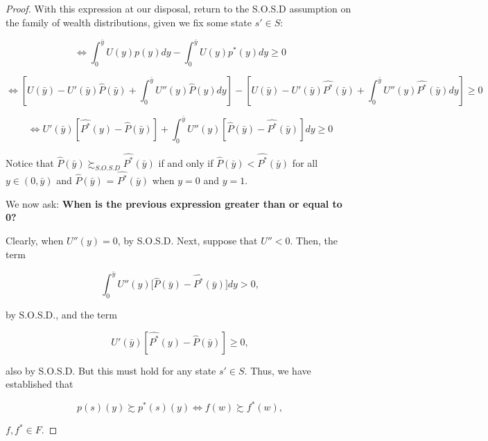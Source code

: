 \documentclass[\econtexRoot/IneqMeas]{subfiles}
\begin{document}
\begin{proof}
	\par With this expression at our disposal, return to the S.O.S.D assumption on the family of wealth distributions, given we fix some state $s' \in S$:
	
$$ \iff \int_{0}^{\bar{y}} U(y)p(y) dy - \int_{0}^{\bar{y}} U(y)p^*(y) dy  \geq 0 $$	

$$ \iff [ U(\bar{y}) - U'(\bar{y}) \hat{P}(\bar{y}) + \int_{0}^{\bar{y}} U''(y) \hat{P}(y) dy ] - [ U(\bar{y}) - U'(\bar{y}) \hat{P^{*}}(\bar{y}) + \int_{0}^{\bar{y}} U''(y) \hat{P^{*}}(\bar{y}) dy ]  \geq 0$$

$$ \iff U'(\bar{y})[\hat{P^{*}}(y) -\hat{P}(\bar{y})] + \int_{0}^{\bar{y}} U''(y) [  \hat{P}(\bar{y}) - \hat{P^{*}}(\bar{y}) ] dy \geq 0$$	

\par Notice that $\hat{P}(\bar{y})\succsim_{S.O.S.D} \hat{P^{*}}(\bar{y}) $ if and only if $\hat{P}(\bar{y}) < \hat{P^{*}}(\bar{y}) $ for all $y \in (0, \bar{y})$ and $\hat{P}(\bar{y})$ = $\hat{P^{*}}(\bar{y})$ when $y=0$ and $y=1$.

\par We now ask: \textbf{When is the previous expression greater than or equal to 0?}

\par Clearly, when $U''(y) =0$, by S.O.S.D. Next, suppose that $U'' < 0$. Then, the term
	
$$ \int_{0}^{\bar{y}} U''(y)\bigg[  \hat{P}(\bar{y}) - \hat{P^{*}}(\bar{y}) \bigg] dy > 0,$$	
	
\par by S.O.S.D., and the term
	
$$  U'(\bar{y})[\hat{P^{*}}(y) -\hat{P}(\bar{y})] \geq 0,$$

	\par also by S.O.S.D. But this must hold for any state $s' \in S$. Thus, we have established that
	
$$ p(s)(y) \succsim p^{*}(s)(y) \iff f(w) \succsim f^{*}(w),$$

	\par $f,f^{*} \in F.$	 	


\end{proof}
\end{document}

